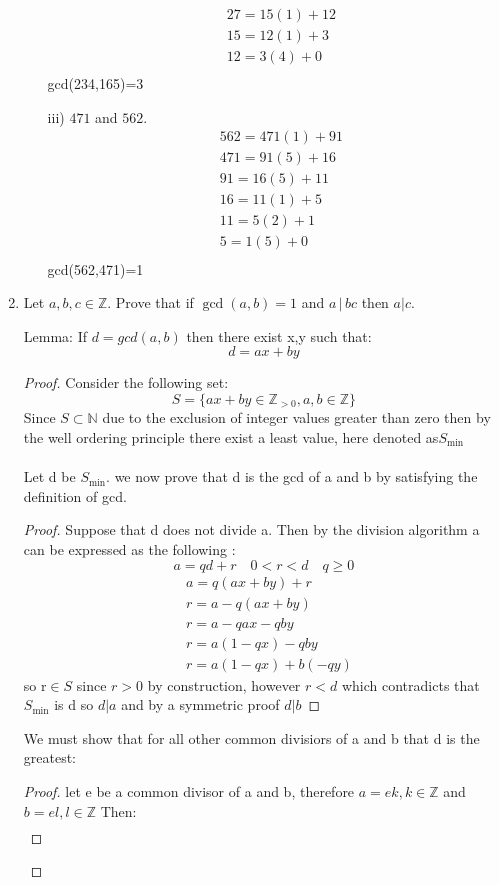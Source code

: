 \documentclass[11pt]{article}
\theoremstyle{definition}  %
\newcommand{\Z}{\mathbb{Z}}
\newcommand{\N}{\mathbb{N}}
\begin{document}
\begin{enumerate}
\begin{itemize}
\begin{align*}
  &27=15(1)+12\\
  &15=12(1)+3\\
  &12=3(4)+0\\
\end{align*}
  gcd(234,165)=3
  \item[iii)] $471$ and $562$.
  \begin{align*}
  &562=471(1)+91\\
  &471=91(5)+16\\
  &91=16(5)+11\\
  &16=11(1)+5\\
  &11=5(2)+1\\
  &5=1(5)+0\\
\end{align*}
gcd(562,471)=1
  \end{itemize}
\item Let $a, b, c \in \Z$. Prove that if $\gcd(a,b) =1$ and $a \, | \, bc$ then $a | c$.\\
\begin{lemma}
  Lemma:
If $d=gcd(a,b)$ then there exist x,y such that: \[
  d=ax+by
\]
\begin{proof}
  Consider the following set:
\[
  S=\{ax+by\in \Z_{>0}, a,b\in \Z\}
\]
Since $S\subset \N$ due to the exclusion of integer values greater than zero then by the well ordering principle there exist a least value, here denoted as$S_{\min}$\\\\
Let d be $S_{\min}$. we now prove that d is the gcd of a and b by satisfying the definition of gcd.
\begin{proof}
  Suppose that d does not divide a. Then by the division algorithm a can be expressed as the following :
  \[
    a=qd+r\quad 0<r<d\quad q\geq 0
  \]
\begin{align*}
  &a=q(ax+by)+r\\
  &r=a-q(ax+by)\\
  &r=a-qax-qby\\
  &r=a(1-qx)-qby\\
  &r=a(1-qx)+b(-qy)
\end{align*}
so r$\in S$ since $r>0$ by construction, however $r<d$ which contradicts that $S_{\min}$ is d so $d|a$ and by a symmetric proof $d|b$
\end{proof}
We must show that for all other common divisiors of a and b that d is the greatest:
\begin{proof}
  let e be a common divisor of a and b, therefore $a=ek,k\in \Z$ and $b=el,l\in \Z$ Then:
  \begin{align*}

\end{align*}
\end{proof}
\end{proof}
\end{lemma}
\end{enumerate}
\end{document}

